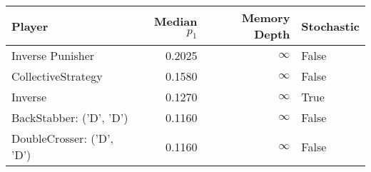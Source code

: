 \begin{tabular}{lrrl}
\toprule
                    Player &  Median $p_1$ &  Memory Depth & Stochastic \\
\midrule
          Inverse Punisher &        0.2025 &            \(\infty\) &      False \\
        CollectiveStrategy &        0.1580 &            \(\infty\) &      False \\
                   Inverse &        0.1270 &            \(\infty\) &       True \\
   BackStabber: ('D', 'D') &        0.1160 &            \(\infty\) &      False \\
 DoubleCrosser: ('D', 'D') &        0.1160 &            \(\infty\) &      False \\
\bottomrule
\end{tabular}
